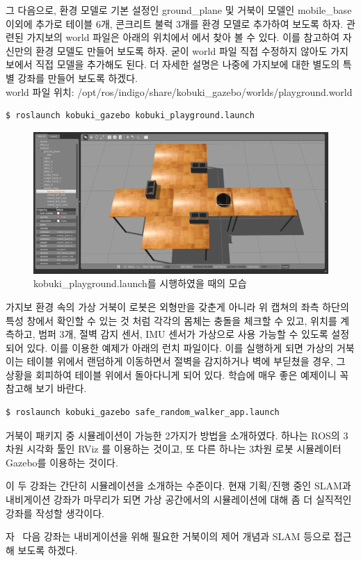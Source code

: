 그 다음으로,  환경 모델로 기본 설정인 ground\_plane 및 거북이 모델인 mobile\_base 이외에 추가로 테이블 6개, 콘크리트 불럭 3개를 환경 모델로 추가하여 보도록 하자. 관련된 가지보의 world 파일은 아래의 위치에서 에서 찾아 볼 수 있다.  이를 참고하여 자신만의 환경 모델도 만들어 보도록 하자. 굳이 world 파일 직접 수정하지 않아도 가지보에서 직접 모델을 추가해도 된다. 더 자세한 설명은 나중에 가지보에 대한 별도의 특별 강좌를 만들어 보도록 하겠다.\\
world 파일 위치: /opt/ros/indigo/share/kobuki\_gazebo/worlds/playground.world

\vspace{\baselineskip}
\begin{lstlisting}[language=ROS]
$ roslaunch kobuki_gazebo kobuki_playground.launch
\end{lstlisting}

\begin{figure}[h]
\centering\includegraphics[width=0.9\columnwidth]{pictures/chapter10/gazebo_kobuki_playground.png}
\caption{kobuki\_playground.launch를 시행하였을 때의 모습}
\end{figure}

가지보 환경 속의 가상 거북이 로봇은 외형만을 갖춘게 아니라 위 캡쳐의 좌측 하단의 특성 창에서 확인할 수 있는 것 처럼 각각의 몸체는 충돌을 체크할 수 있고, 위치를 계측하고, 범퍼 3개, 절벽 감지 센서, IMU 센서가 가상으로 사용 가능할 수 있도록 설정되어 있다. 이를 이용한 예제가 아래의 런치 파일이다. 이를 실행하게 되면 가상의 거북이는 테이블 위에서 랜덤하게 이동하면서 절벽을 감지하거나 벽에 부딛쳤을 경우, 그 상황을 회피하여 테이블 위에서 돌아다니게 되어 있다. 학습에 매우 좋은 예제이니 꼭 참고해 보기 바란다.

\vspace{\baselineskip}
\begin{lstlisting}[language=ROS]
$ roslaunch kobuki_gazebo safe_random_walker_app.launch
\end{lstlisting}

거북이 패키지 중 시뮬레이션이 가능한 2가지가 방법을 소개하였다. 하나는 ROS의 3차원 시각화 툴인 RViz 를 이용하는 것이고, 또 다른 하나는 3차원 로봇 시뮬레이터 Gazebo를 이용하는 것이다. 

이 두 강좌는 간단히 시뮬레이션을 소개하는 수준이다. 현재 기획/진행 중인 SLAM과 내비게이션 강좌가 마무리가 되면 가상 공간에서의 시뮬레이션에 대해 좀 더 실직적인 강좌를 작성할 생각이다. 

자~ 다음 강좌는 내비게이션을 위해 필요한 거북이의 제어 개념과 SLAM 등으로 접근해 보도록 하겠다.

